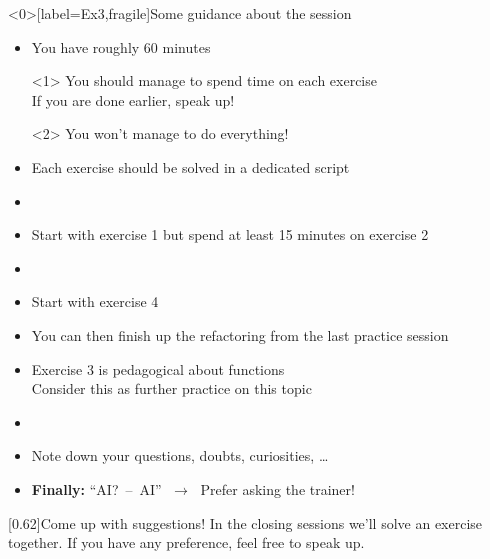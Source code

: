 
\begin{frame}<0>[label=Ex3,fragile]{Some guidance about the session}
    \vspace{-2mm}
    \begin{itemize}
        \item You have roughly 60 minutes\\
              \begin{onlyenv}<1>
                  \then You should manage to spend time on each exercise\\
                  \then If you are done earlier, speak up!
              \end{onlyenv}
              \begin{onlyenv}<2>
                  \then You won't manage to do everything! 
              \end{onlyenv}
        \item Each exercise should be solved in a dedicated script
        \item<only@1> 
        \item<only@1> Start with exercise 1 but spend at least 15 minutes on exercise 2
        \item<only@2> 
        \item<only@2> Start with exercise 4
        \item<only@2> You can then finish up the refactoring from the last practice session
        \item<only@2> Exercise 3 is pedagogical about functions\\
              \then Consider this as further practice on this topic
        \item {}
        \item Note down your questions, doubts, curiosities, \ldots
        \item \alert{\textbf{Finally:} ``AI?~--~AI'' $\;\to\;$ Prefer asking the trainer!} 
    \end{itemize}
    \begin{varblock}{}[0.62\textwidth]{Come up with suggestions!}
        In the closing sessions we'll solve an exercise together.
        If you have any preference, feel free to speak up.
    \end{varblock}
\end{frame}

